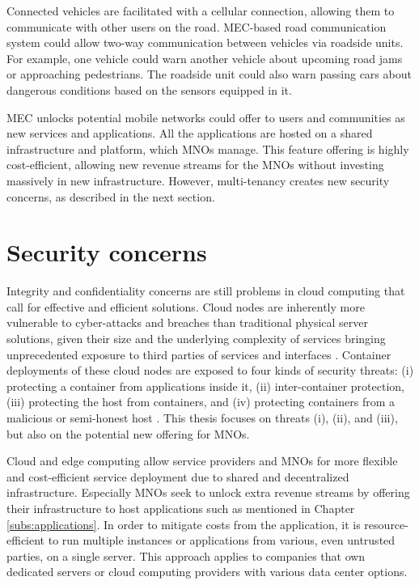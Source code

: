 Connected vehicles are facilitated with a cellular connection, allowing them to communicate with other users on the road. MEC-based road communication system could allow two-way communication between vehicles via roadside units. For example, one vehicle could warn another vehicle about upcoming road jams or approaching pedestrians. The roadside unit could also warn passing cars about dangerous conditions based on the sensors equipped in it. \cite{Abbas2018}

MEC unlocks potential mobile networks could offer to users and communities as new services and applications. All the applications are hosted on a shared infrastructure and platform, which MNOs manage. This feature offering is highly cost-efficient, allowing new revenue streams for the MNOs without investing massively in new infrastructure. However, multi-tenancy creates new security concerns, as described in the next section.

\section{Security concerns}
\label{section:security}

Integrity and confidentiality concerns are still problems in cloud computing that call for effective and efficient solutions. Cloud nodes are inherently more vulnerable to cyber-attacks and breaches than traditional physical server solutions, given their size and the underlying complexity of services bringing unprecedented exposure to third parties of services and interfaces \cite{Lombardi2011}. Container deployments of these cloud nodes are exposed to four kinds of security threats: (i) protecting a container from applications inside it, (ii) inter-container protection, (iii) protecting the host from containers, and (iv) protecting containers from a malicious or semi-honest host \cite{Flauzac2020}. This thesis focuses on threats (i), (ii), and (iii), but also on the potential new offering for MNOs.

Cloud and edge computing allow service providers and MNOs for more flexible and cost-efficient service deployment due to shared and decentralized infrastructure. Especially MNOs seek to unlock extra revenue streams by offering their infrastructure to host applications such as mentioned in Chapter \ref{subs:applications}. In order to mitigate costs from the application, it is resource-efficient to run multiple instances or applications from various, even untrusted parties, on a single server. This approach applies to companies that own dedicated servers or cloud computing providers with various data center options.


